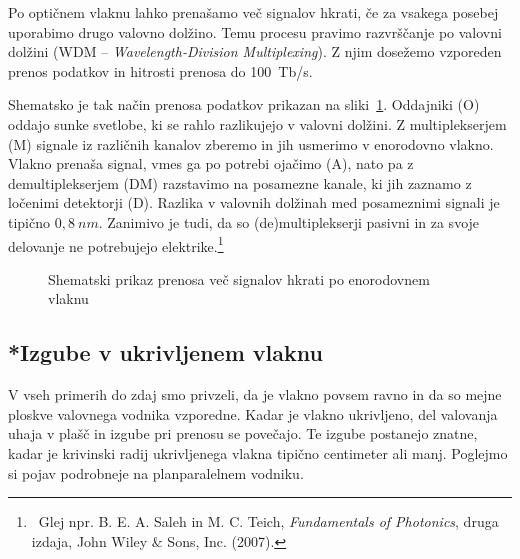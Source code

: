 \begin{remark}
Po optičnem 
vlaknu lahko prenašamo več signalov hkrati, če za vsakega posebej uporabimo
drugo valovno dolžino. Temu procesu pravimo razvrščanje po valovni dolžini
(WDM -- {\it Wavelength-Division Multiplexing}). 
Z njim dosežemo vzporeden prenos podatkov in hitrosti prenosa do 100~Tb/s.
 
Shematsko je tak način prenosa podatkov prikazan na sliki~\ref{WDM}.
Oddajniki (O) oddajo sunke svetlobe, ki se rahlo razlikujejo v valovni dolžini. 
Z multiplekserjem (M) signale iz različnih kanalov zberemo in jih usmerimo v 
enorodovno vlakno. Vlakno prenaša signal, vmes ga po potrebi ojačimo (A), 
nato pa z demultiplekserjem (DM)  razstavimo na posamezne kanale, ki jih 
zaznamo z ločenimi detektorji (D). Razlika v valovnih dolžinah med posameznimi signali 
je tipično $0,8~\si{nm}$. Zanimivo je tudi, da so (de)multiplekserji pasivni in za 
svoje delovanje ne potrebujejo elektrike.\footnote{~Glej npr. B. E. A. Saleh in M. C. Teich, 
{\it Fundamentals of Photonics}, druga izdaja, John Wiley \& Sons, Inc. (2007).}
\begin{figure}[ht]
\centering
\def\svgwidth{120truemm} 
 
\caption{Shematski prikaz prenosa več signalov hkrati po enorodovnem vlaknu}
\label{WDM}
\end{figure}
\end{remark}
\subsection*{*Izgube v ukrivljenem vlaknu}
V vseh primerih do zdaj smo privzeli, da je vlakno povsem ravno in 
da so mejne ploskve valovnega vodnika vzporedne. 
Kadar je vlakno ukrivljeno, del valovanja uhaja v plašč in 
izgube pri prenosu se povečajo. Te izgube postanejo znatne, 
kadar je krivinski radij ukrivljenega vlakna tipično centimeter ali manj. 
Poglejmo si pojav podrobneje na planparalelnem vodniku.

